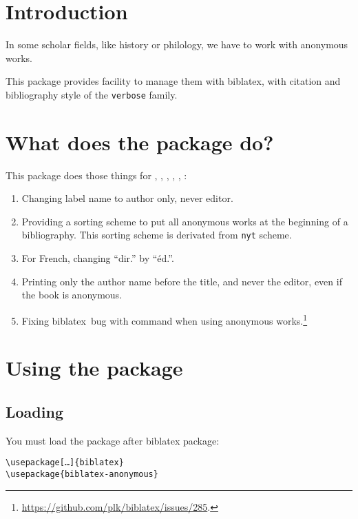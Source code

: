 \documentclass{ltxdockit}[2011/03/25]
\newcommand{\biblatex}{biblatex\xspace}
\newcommand{\namebibstyle}[1]{\texttt{#1}}
\begin{document}
\printtitlepage
\tableofcontents

\section{Introduction}

In some scholar fields, like history or philology, we have to work with anonymous works. 

This package provides facility to manage them with \biblatex, with citation and bibliography style of the \namebibstyle{verbose} family.

\section{What does the package do?}

This package does those things for  , , , , , :
\begin{enumerate}
	

	\item Changing label name to author only, never editor.
	\item Providing a sorting scheme to put all anonymous works at the beginning of a bibliography. This sorting scheme is derivated from \verb+nyt+ scheme.
	\item For French, changing \enquote{dir.} by \enquote{éd.}.
	\item Printing only the author name  before the title, and never the editor, even if the book is anonymous.
 	\item Fixing \biblatex\ bug with  \expandafter\cs\expandafter{\prm{xx}cites} command when using anonymous works.\footnote{\url{https://github.com/plk/biblatex/issues/285}.}
		
\end{enumerate}

\section{Using the package}

\subsection{Loading}
You must load the package after \biblatex package:
\begin{verbatim}
\usepackage[…]{biblatex}
\usepackage{biblatex-anonymous}
\end{verbatim}
\end{document}
